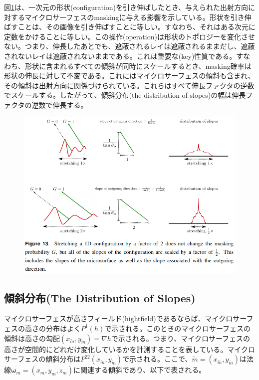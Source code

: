 \documentclass[a4j,xelatex,ja=standard]{bxjsarticle}
\begin{document}
図\ref{fig:13}は、一次元の形状(configuration)を引き伸ばしたとき、与えられた出射方向に対するマイクロサーフェスのmaskingに与える影響を示している。形状を引き伸ばすことは、その画像を引き伸ばすことに等しい。すなわち、それはある次元に定数をかけることに等しい。この操作(operation)は形状のトポロジーを変化させない。つまり、伸長したあとでも、遮蔽されるレイは遮蔽されるままだし、遮蔽されないレイは遮蔽されないままである。これは重要な(key)性質である。すなわち、形状に含まれるすべての傾斜が同時にスケールするとき、masking確率は形状の伸長に対して不変である。これにはマイクロサーフェスの傾斜も含まれ、その傾斜は出射方向に関係づけられている。これらはすべて伸長ファクタの逆数でスケールする。したがって、傾斜分布(the distribution of slopes)の幅は伸長ファクタの逆数で伸長する。

\begin{figure}
    \includegraphics[width=\textwidth]{Figure13.png}
    \caption{}
    \label{fig:13}
\end{figure}

\subsection{傾斜分布(The Distribution of Slopes)}

マイクロサーフェスが高さフィールド(hightfield)であるならば、マイクロサーフェスの高さの分布はよく$P^1(h)$で示される。このときのマイクロサーフェスの傾斜は高さの勾配$(x_{\tilde{m}}, y_{\tilde{m}}) = \nabla h$で示される。つまり、マイクロサーフェスの高さが空間的にどれだけ変化しているかを計測することを表している。マイクロサーフェスの傾斜分布は$P^{22}(x_{\tilde{m}}, y_{\tilde{m}})$で示される。ここで、$\tilde{m} = (x_{\tilde{m}}, y_{\tilde{m}})$は法線$\boldsymbol{\omega}_m = (x_m, y_m, z_m)$に関連する傾斜であり、以下で表される。
\end{document}
